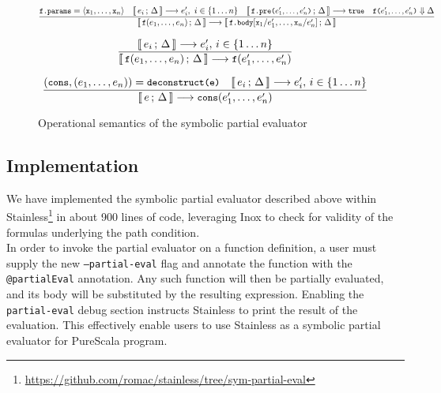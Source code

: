 \documentclass[a4paper,twoside]{article}
\newcommand{\lb}[2]{\llbracket\, #1\,;\, #2\, \rrbracket}
\newcommand{\stt}[1]{\texttt{\small{#1}}}
\begin{document}
\begin{landscape}
\begin{figure}[htb]
\begin{framed}
\begin{equation}
\dfrac{
 \stt{f.params} = \langle \stt{x}_1, \ldots, \stt{x}_n \rangle
 \quad
 \lb{e_i}{\Delta} \longrightarrow e_i',\  i \in \{1 \ldots n\}
 \quad
 \lb{\stt{f.pre($e_1',\ldots,e_n'$)}}{\Delta} \longrightarrow \stt{true}
 \quad  \stt{f($e_1',\ldots,e_n'$)} \Downarrow \Delta
}{
  \lb{\stt{f}(e_1,\ldots,e_n)}{\Delta} \longrightarrow
  \lb{\stt{f.body}[\stt{x}_1/e_1',\ldots,\stt{x}_n/e_n']}{\Delta}
}
\label{fig:symbolicsem:fi2}
\end{equation}

\begin{equation}
\dfrac{
 \lb{e_i}{\Delta} \longrightarrow e_i',\, i \in \{1 \ldots n\}
}{
  \lb{\stt{f}(e_1,\ldots,e_n)}{\Delta} \longrightarrow
  \stt{f}(e_1',\ldots,e_n')
}
\label{fig:symbolicsem:fi3}
\end{equation}

\begin{equation}
\dfrac{
  (\stt{cons}, (e_1, \ldots, e_n)) = \stt{deconstruct(e)} \quad
  \lb{e_i}{\Delta} \longrightarrow e_i',\, i \in \{1 \ldots n\}
}{
  \lb{e}{\Delta} \longrightarrow \stt{cons}(e_1', \ldots, e_n')
}
\end{equation}

\end{framed}
\vspace{-10pt}
\caption{Operational semantics of the symbolic partial evaluator \label{fig:symbolicsem}}
\end{figure}
\end{landscape}

\subsection{Implementation}

We have implemented the symbolic partial evaluator described above within Stainless\footnote{\url{https://github.com/romac/stainless/tree/sym-partial-eval}} in about 900 lines of code, leveraging Inox to check for validity of the formulas underlying the path condition.\\

In order to invoke the partial evaluator on a function definition, a user must supply the new \stt{--partial-eval} flag and annotate the function with the \stt{@partialEval} annotation. Any such function will then be partially evaluated, and its body will be substituted by the resulting expression. Enabling the \stt{partial-eval} debug section instructs Stainless to print the result of the evaluation. This effectively enable users to use Stainless as a symbolic partial evaluator for PureScala program.
\end{document}
